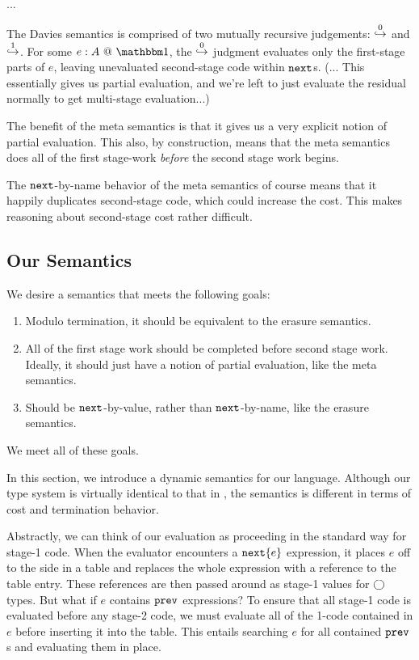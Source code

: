 ...

The Davies semantics is comprised of two mutually recursive judgements: $\overset 0 \hookrightarrow$ and $\overset 1 \hookrightarrow$.  For some $\colone e A$, the $\overset 0 \hookrightarrow$ judgment evaluates only the first-stage parts of $e$, leaving unevaluated second-stage code within ${\tt next}$s.  (... This essentially gives us partial evaluation, and we're left to just evaluate the residual normally to get multi-stage evaluation...) 

The benefit of the meta semantics is that it gives us a very explicit notion of partial evaluation.  This also, by construction, means that the meta semantics does all of the first stage-work {\em before} the second stage work begins. 

The ${\tt next}$-by-name behavior of the meta semantics of course means that it happily duplicates second-stage code, which could increase the cost.  This makes reasoning about second-stage cost rather difficult.

\subsection{Our Semantics}

We desire a semantics that meets the following goals:

\begin{enumerate}
\item Modulo termination, it should be equivalent to the erasure semantics.
\item All of the first stage work should be completed before second stage work.  Ideally, it should just have a notion of partial evaluation, like the meta semantics.
\item Should be ${\tt next}$-by-value, rather than ${\tt next}$-by-name, like the erasure semantics.  
\end{enumerate}

We meet all of these goals.

In this section, we introduce a dynamic semantics for our language.  Although our type system is virtually identical to that in \cite{davies96}, the semantics is different in terms of cost and termination behavior. 

Abstractly, we can think of our evaluation as proceeding in the standard way for stage-1 code. When the evaluator encounters a ${\tt next} \{e\}$ expression, it places $e$ off to the side in a table and replaces the whole expression with a reference to the table entry.  These references are then passed around as stage-1 values for $\bigcirc$ types.  But what if $e$ contains ${\tt prev}$ expressions?  To ensure that all stage-1 code is evaluated before any stage-2 code, we must evaluate all of the 1-code contained in $e$ before inserting it into the table.  This entails searching $e$ for all contained ${\tt prev}$s and evaluating them in place.  


